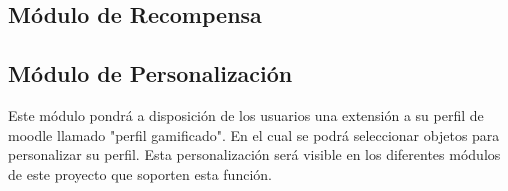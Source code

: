 \subsection*{Módulo de Recompensa}
%

\subsection*{Módulo de Personalización}

Este módulo pondrá a disposición de los usuarios una extensión a su perfil de moodle llamado "perfil gamificado". En el cual se podrá
seleccionar objetos para personalizar su perfil. Esta personalización será visible en los diferentes módulos de este proyecto que soporten
esta función.










